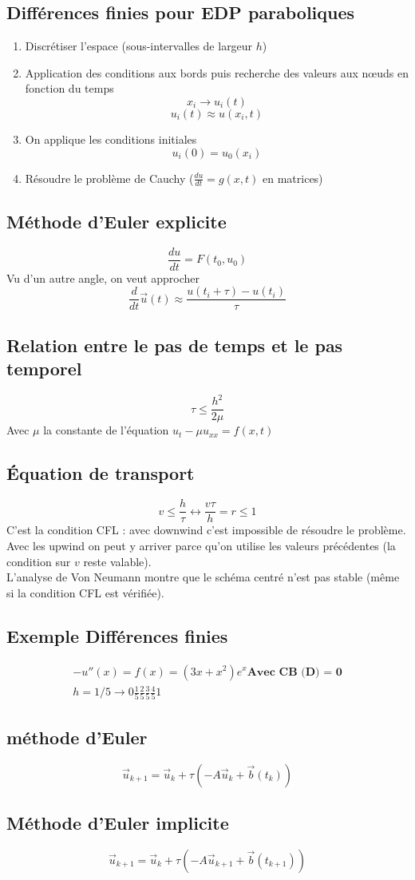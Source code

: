 \documentclass[resume]{subfiles}
\begin{document}
\subsection{Différences finies pour EDP paraboliques}
\begin{enumerate}
\item Discrétiser l'espace (sous-intervalles de largeur $h$)
\item Application des conditions aux bords puis recherche des valeurs aux nœuds en fonction du temps
$$x_i\to u_i(t)$$
$$u_i(t)\approx u(x_i,t)$$
\item On applique les conditions initiales
$$u_i(0)=u_0(x_i)$$
\item Résoudre le problème de Cauchy ($\frac{du}{dt}=g(x,t)$ en matrices)
\end{enumerate}
\subsection{Méthode d'Euler explicite}
$$\frac{du}{dt}=F(t_0,u_0)$$
Vu d'un autre angle, on veut approcher
$$\frac{d}{dt}\vec{u}(t)\approx \frac{u(t_i+\tau)-u(t_i)}{\tau}$$
\subsection{Relation entre le pas de temps et le pas temporel}
$$\tau\leq \frac{h^2}{2\mu}$$
Avec $\mu$ la constante de l'équation $u_t-\mu u_{xx}=f(x,t)$
\subsection{Équation de transport}
$$v\leq \frac{h}{\tau}\longleftrightarrow \frac{v\tau}{h}=r\leq 1$$
C'est la condition CFL : avec downwind c'est impossible de résoudre le problème. Avec les upwind on peut y arriver parce qu'on utilise les valeurs précédentes (la condition sur $v$ reste valable).\\
L'analyse de Von Neumann montre que le schéma centré n'est pas stable (même si la condition CFL est vérifiée).

\subsection{Exemple Différences finies}
\begin{align*} %
-u''(x) = f(x) = (3x+x^2)e^x \textbf{Avec CB (D) = 0}\\
h=1/5 \rightarrow 0 \frac{1}{5} \frac{2}{5} \frac{3}{5} \frac{4}{5} 1
\end{align*}
\subsection{méthode d'Euler}
$$\vec{u}_{k+1}=\vec{u}_k+\tau\left(-A\vec{u}_k+\vec{b}(t_k)\right)$$
\subsection{Méthode d'Euler implicite}
$$\vec{u}_{k+1}=\vec{u}_k+\tau\left(-A\vec{u}_{k+1}+\vec{b}(t_{k+1})\right)$$
\end{document}
